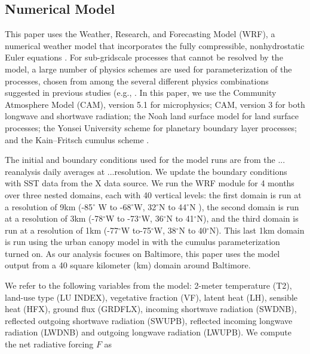 \subsection{Numerical Model}
This paper uses the Weather, Research, and Forecasting Model (WRF), a numerical weather model that incorporates the fully
compressible, nonhydrostatic Euler equations \cite{skamarock2008description}. %
For sub-gridscale processes that cannot be resolved by the model, a large number of physics schemes are 
used for parameterization of the processes, chosen from among the
several different physics combinations suggested in
previous studies (e.g., \cite{argueso2011evaluation, giannakopoulou2012persian, efstathiou2013sensitivity, zittis2014comparison}. %
In this paper, we use the
Community Atmosphere Model (CAM), version 5.1 \citep{neale2010description} %
for microphysics; CAM, version 3 \citep{collins2004description} %
for both longwave and shortwave radiation;
the Noah land surface model \citep{ek2003implementation} %
for land surface processes; 
the Yonsei University scheme \citep{hong2006new} %
for planetary boundary layer processes;
and the Kain–Fritsch cumulus scheme \citep{kain1990one}. %

The initial and boundary conditions
used for the model runs are from the ...
reanalysis daily averages at ...resolution. We update the boundary conditions with SST data from the X data source. 
We run the WRF module for 4 months over three nested domains, each with 40 vertical levels: the first domain is run at a resolution of 9km (-85$^\circ$ W to -68$^\circ$W, 32$^\circ$N to 44$^\circ$N ), the second domain is run at a resolution of 3km (-78$^\circ$W to -73$^\circ$W, 36$^\circ$N to 41$^\circ$N), and the third domain is run at a resolution of 1km (-77$^\circ$W to-75$^\circ$W, 38$^\circ$N to 40$^\circ$N). This last 1km domain is run using the urban canopy model in \cite{chen2011integrated} with the cumulus parameterization turned on. 
As our analysis focuses on Baltimore, this paper uses the model output from a 40 square kilometer (km) domain around Baltimore.

We refer to the following variables from the model: 2-meter temperature (T2),
 land-use type (LU INDEX), vegetative fraction (VF),
 latent heat (LH), 
 sensible heat (HFX), ground flux (GRDFLX), 
incoming shortwave radiation (SWDNB),
reflected outgoing shortwave radiation (SWUPB), 
reflected incoming longwave radiation (LWDNB) and outgoing longwave radiation (LWUPB).  
We compute the net radiative forcing  $F$ as

